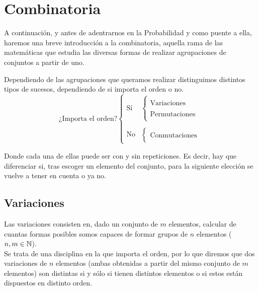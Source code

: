 \chapter{Combinatoria}

A continuación, y antes de adentrarnos en la Probabilidad y como puente a ella, haremos una breve introducción a la combinatoria, aquella rama de las matemáticas que estudia las diversas formas de realizar agrupaciones de conjuntos a partir de uno.

Dependiendo de las agrupaciones que queramos realizar distinguimos distintos tipos de sucesos, dependiendo de si importa el orden o no.
\begin{equation*}
    \text{¿Importa el orden?} \left\{
    \begin{array}{ll}
        \text{Sí} &\left\{
            \begin{array}{l}
                ~ \\
                \text{Variaciones}\\
                ~\\
                \text{Permutaciones}\\
                ~
            \end{array}
        \right.\\
        ~ \\
        \text{No}&\left\{
            \begin{array}{l}
                ~ \\
                \text{Conmutaciones}\\
                ~
            \end{array}
        \right.
    \end{array}
    \right.
\end{equation*}

Donde cada una de ellas puede ser con y sin repeticiones. Es decir, hay que diferenciar si, tras escoger un elemento del conjunto, para la siguiente elección se vuelve a tener en cuenta o ya no.

\section{Variaciones}

Las variaciones consisten en, dado un conjunto de $m$ elementos, calcular de cuantas formas posibles somos capaces de formar grupos de $n$ elementos ($n, m\in \mathbb N$).\\

Se trata de una disciplina en la que importa el orden, por lo que diremos que dos variaciones de $n$ elementos
(ambas obtenidas a partir del mismo conjunto de $m$ elementos) son distintas si y sólo si tienen distintos
elementos o si estos están dispuestos en distinto orden.\\

